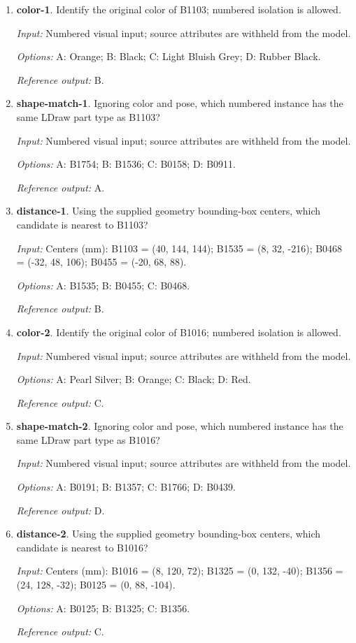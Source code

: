\begin{enumerate}
\item \textbf{color-1}. Identify the original color of B1103; numbered isolation is allowed.\par {\small \textit{Input:} Numbered visual input; source attributes are withheld from the model. \par\textit{Options:} A: Orange; B: Black; C: Light Bluish Grey; D: Rubber Black. \par\textit{Reference output:} B.}
\item \textbf{shape-match-1}. Ignoring color and pose, which numbered instance has the same LDraw part type as B1103?\par {\small \textit{Input:} Numbered visual input; source attributes are withheld from the model. \par\textit{Options:} A: B1754; B: B1536; C: B0158; D: B0911. \par\textit{Reference output:} A.}
\item \textbf{distance-1}. Using the supplied geometry bounding-box centers, which candidate is nearest to B1103?\par {\small \textit{Input:} Centers (mm): B1103 = (40, 144, 144); B1535 = (8, 32, -216); B0468 = (-32, 48, 106); B0455 = (-20, 68, 88). \par\textit{Options:} A: B1535; B: B0455; C: B0468. \par\textit{Reference output:} B.}
\item \textbf{color-2}. Identify the original color of B1016; numbered isolation is allowed.\par {\small \textit{Input:} Numbered visual input; source attributes are withheld from the model. \par\textit{Options:} A: Pearl Silver; B: Orange; C: Black; D: Red. \par\textit{Reference output:} C.}
\item \textbf{shape-match-2}. Ignoring color and pose, which numbered instance has the same LDraw part type as B1016?\par {\small \textit{Input:} Numbered visual input; source attributes are withheld from the model. \par\textit{Options:} A: B0191; B: B1357; C: B1766; D: B0439. \par\textit{Reference output:} D.}
\item \textbf{distance-2}. Using the supplied geometry bounding-box centers, which candidate is nearest to B1016?\par {\small \textit{Input:} Centers (mm): B1016 = (8, 120, 72); B1325 = (0, 132, -40); B1356 = (24, 128, -32); B0125 = (0, 88, -104). \par\textit{Options:} A: B0125; B: B1325; C: B1356. \par\textit{Reference output:} C.}

\end{enumerate}
